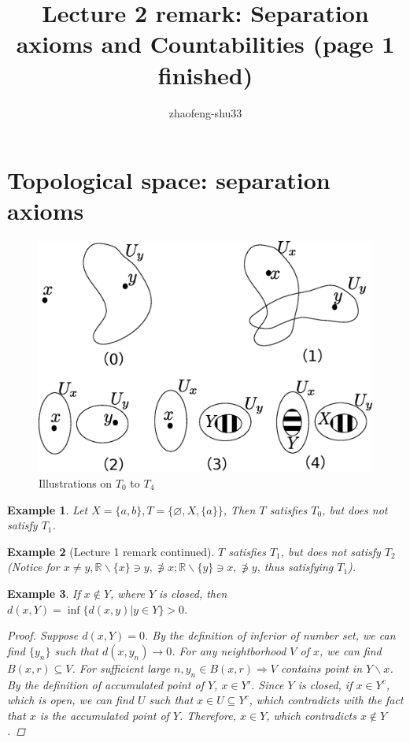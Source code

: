 \documentclass{article}
\def\emptyset{\varnothing}
\newtheorem{example}{Example}[section] %
\begin{document}
% 
\title{Lecture 2 remark: Separation axioms and Countabilities (page 1 finished)}
\author{zhaofeng-shu33}
\maketitle
\section{Topological space: separation axioms}

\begin{figure}[!ht]
\centering
\includegraphics[width=\textwidth]{T04.eps}
\caption{Illustrations on $T_0$ to $T_4$}
\end{figure}
\setcounter{example}{0}
\begin{example}
Let $X=\{a,b\},T=\{\emptyset,X,\{a\}\}$, Then $T$ satisfies $T_0$, but does not satisfy $T_1$.
\end{example}
\begin{example}[Lecture 1 remark  continued]
$T$ satisfies $T_1$, but does not satisfy $T_2$ (Notice for $x\neq y, \mathbb{R}\backslash\{x\}\ni y,\not\owns x; \mathbb{R}\backslash\{y\} \ni x,\not\owns y$, thus satisfying $T_1$).
\end{example}
\begin{example}
If $x\notin Y$, where $Y$ is closed, then $d(x,Y)=\inf\{d(x,y)|y\in Y\}>0$.
\begin{proof}
Suppose $d(x,Y)=0$. By the definition of inferior of number set, we can find $\{y_n\}$ such that $d(x,y_n)\to 0$.
For any neightborhood $V$ of $x$, we can find $B(x,r)\subseteq V$. For sufficient large $n,y_n \in B(x,r) \Rightarrow V$ contains point in $Y\backslash{x}$.
By the definition of accumulated point of $Y$, $x\in Y'$. Since $Y$ is closed, if $x \in Y^c$, which is open, we can find $U$ such that $x\in U\subseteq Y^c$, which contradicts with the fact that $x$ is the accumulated point of $Y$. Therefore, $x\in Y$, which contradicts $x\notin Y$.
\end{proof}
\end{example}
\end{document}
